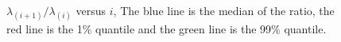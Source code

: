 \documentclass[11pt,reqno]{amsart}
\newcommand{\1}{\mathds{1}}
\newcommand{\0}{\boldsymbol{0}}
\newcommand{\4}{\mathchoice{\mskip1.5mu}{\mskip1.5mu}{}{}}
\newcommand{\5}{\mathchoice{\mskip-1.5mu}{\mskip-1.5mu}{}{}}
\newcommand{\2}{\penalty250\mskip\thickmuskip\mskip-\thinmuskip} %
\begin{document}
\begin{figure}[htb!]
{  }
  \caption{$\lambda_{(i+1)} / \lambda_{(i)}$ versus $i$, The blue line
  is the median of the ratio, the red line is the 1\% quantile
  and the green line is the 99\% quantile.}
  \label{fig:EigenRatio}
\end{figure}
\end{document}
